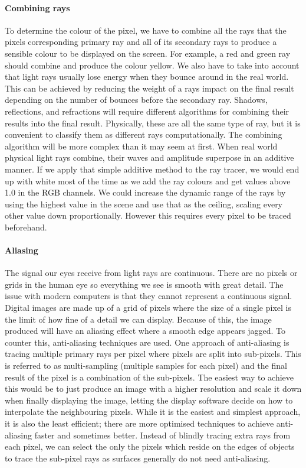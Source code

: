 \documentclass[final]{cmpreport}
\begin{document}
\paragraph{Combining rays} \citep[1.2.3]{introraytracing} To determine the colour of the pixel, we have to combine all the rays that the pixels corresponding primary ray and all of its secondary rays to produce a sensible colour to be displayed on the screen. For example, a red and green ray should combine and produce the colour yellow. We also have to take into account that light rays usually lose energy when they bounce around in the real world. This can be achieved by reducing the weight of a rays impact on the final result depending on the number of bounces before the secondary ray. Shadows, reflections, and refractions will require different algorithms for combining their results into the final result. Physically, these are all the same type of ray, but it is convenient to classify them as different rays computationally. The combining algorithm will be more complex than it may seem at first. When real world physical light rays combine, their waves and amplitude superpose in an additive manner. If we apply that simple additive method to the ray tracer, we would end up with white most of the time as we add the ray colours and get values above 1.0 in the RGB channels. We could increase the dynamic range of the rays by using the highest value in the scene and use that as the ceiling, scaling every other value down proportionally. However this requires every pixel to be traced beforehand.

\paragraph{Aliasing} \citep[1.4]{introraytracing} The signal our eyes receive from light rays are continuous. There are no pixels or grids in the human eye so everything we see is smooth with great detail. The issue with modern computers is that they cannot represent a continuous signal. Digital images are made up of a grid of pixels where the size of a single pixel is the limit of how fine of a detail we can display. Because of this, the image produced will have an aliasing effect where a smooth edge appears jagged. To counter this, anti-aliasing techniques are used. One approach of anti-aliasing is tracing multiple primary rays per pixel where pixels are split into sub-pixels. This is referred to as multi-sampling (multiple samples for each pixel) and the final result of the pixel is a combination of the sub-pixels. The easiest way to achieve this would be to just produce an image with a higher resolution and scale it down when finally displaying the image, letting the display software decide on how to interpolate the neighbouring pixels. While it is the easiest and simplest approach, it is also the least efficient; there are more optimised techniques to achieve anti-aliasing faster and sometimes better. Instead of blindly tracing extra rays from each pixel, we can select the only the pixels which reside on the edges of objects to trace the sub-pixel rays as surfaces generally do not need anti-aliasing.
\end{document}

